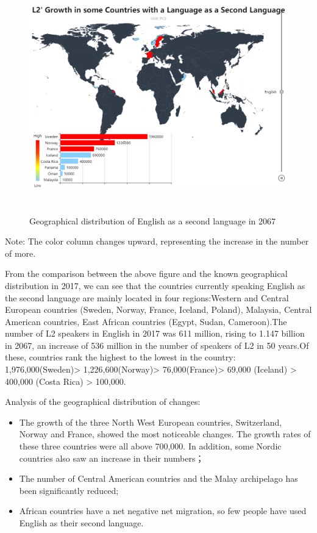 \begin{figure}[H]
	\centering
	\includegraphics[width=1\linewidth,height=10cm]{figures/english}
	\caption{Geographical distribution of English as a second language in 2067}
	\label{fig:english}
\end{figure}

\noindent Note: The color column changes upward, representing the increase in the number of more.

 From the comparison between the above figure and the known geographical distribution in 2017, we can see that the countries currently speaking English as the second language are mainly located in four regions:Western and Central European countries (Sweden, Norway, France, Iceland, Poland), Malaysia, Central American countries, East African countries (Egypt, Sudan, Cameroon).The number of L2 speakers in English in 2017 was 611 million, rising to 1.147 billion in 2067, an increase of 536 million in the number of speakers of L2 in 50 years.Of these, countries rank the highest to the lowest in the country: 1,976,000(Sweden)> 1,226,600(Norway)> 76,000(France)> 69,000 (Iceland) > 400,000 (Costa Rica) > 100,000.
\par Analysis of the geographical distribution of changes:
\begin{itemize}
	\item The growth of the three North West European countries, Switzerland, Norway and France, showed the most noticeable changes. The growth rates of these three countries were all above 700,000. In addition, some Nordic countries also saw an increase in their numbers；
	\item The number of Central American countries and the Malay archipelago has been significantly reduced;
	\item African countries have a net negative net migration, so few people have used English as their second language. 
\end{itemize} 


